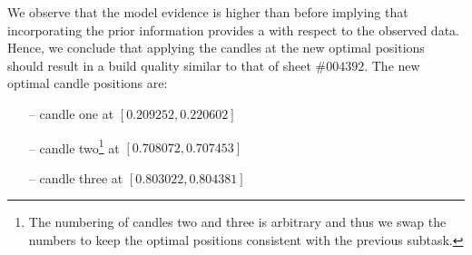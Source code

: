 \documentclass{article}
\begin{document}
    We observe that the model evidence is higher than before implying that
    incorporating the prior information provides a  with
    respect to the observed data.
    Hence, we conclude that applying the candles at the new optimal
    positions should result in a build quality similar to that of sheet
    $\#004392$.
    The new optimal candle positions are:
    \begin{itemize}
        \item[--] candle one at $[0.209252, 0.220602]$
        \item[--] candle two\footnote{The numbering of
        candles two and three is arbitrary and thus we swap the numbers to
        keep the optimal positions consistent with the previous subtask.} at
        $[0.708072, 0.707453]$
        \item[--] candle three at $[0.803022, 0.804381]$
    \end{itemize}
\end{document}

